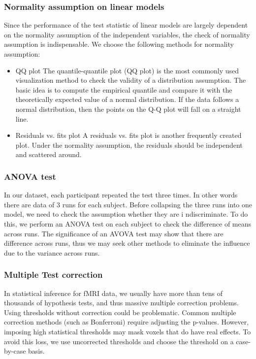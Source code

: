 \documentclass[11pt]{article}
\begin{document}
\subsubsection{Normality assumption on linear models}

Since the performance of the test statistic of linear models are largely 
dependent on the normality assumption of the independent variables, the check of 
normality assumption is indispensable. We choose the following methods for 
normality assumption:

\begin{itemize}
\item{QQ plot} The quantile-quantile plot (QQ plot) is the most commonly used 
visualization method to check the validity of a distribution assumption. The 
basic idea is to compute the empirical quantile and compare it with the 
theoretically expected value of a normal distribution. If the data follows a 
normal distribution, then the points on the Q-Q plot will fall on a straight 
line. 
\item{Residuals vs. fits plot} A residuals vs. fits plot is another
frequently created plot. Under the normality assumption, the residuals should 
be independent and scattered around.
\end{itemize}

\subsubsection{ANOVA test}

In our dataset, each participant repeated the test three times. In other 
words there are data of 3 runs for each subject. Before collapsing the three 
runs into one model, we need to check the assumption whether they are i
ndiscriminate.  To do this, we perform an ANOVA test on each subject to check 
the difference of means across runs. The significance of an AVOVA test may 
show that there are difference across runs, thus we may seek other methods to 
eliminate the influence due to the variance across runs.

\subsubsection{Multiple Test correction}

In statistical inference for fMRI data, we usually have more than tens of 
thousands of hypothesis tests, and thus massive multiple correction problems. 
Using thresholds without correction could be problematic. Common multiple 
correction methods (such as Bonferroni) require adjusting the p-values. 
However, imposing high statistical thresholds may mask voxels that do have 
real effects. To avoid this loss, we use uncorrected thresholds and choose the 
threshold on a case-by-case basis.
\end{document}
